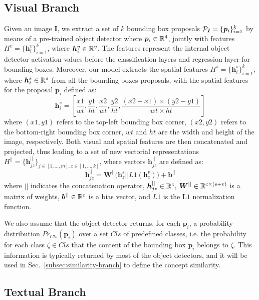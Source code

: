 \subsection{Visual Branch}
\label{subsec:visual-branch}

Given an image $\bm{I}$, we extract a set of $k$ bounding box
proposals $\mathcal{P}_{\bm{I}} = \{ \bm{p}_i \}^k_{i=1}$ by means of a
pre-trained object detector where $\bm{p}_i \in \mathbb{R}^4$, jointly with
features $H^v = \{ \bm{h}^v_i \}^k_{i=1}$, where $\bm{h}^v_i \in
\mathbb{R}^v$. The features represent the internal object detector
activation values before the classification layers and regression
layer for bounding boxes. Moreover, our model extracts the spatial
features $H^s = \{ \bm{h}^s_i \}^k_{i=1}$, where $\bm{h}^s_i \in
\mathbb{R}^s$ from all the bounding boxes proposals, with the spatial
features for the proposal $\bm{p}_i$ defined as:
\begin{equation}
  \bm{h}^s_i = \left[ \frac{x1}{wt}, \frac{y1}{ht}, \frac{x2}{wt}, \frac{y2}{ht}, \frac{(x2 - x1) \times (y2 - y1)}{wt \times ht}  \right]
\end{equation}
where $(x1, y1)$ refers to the top-left bounding box corner, $(x2,
y2)$ refers to the bottom-right bounding box corner, $wt$ and $ht$ are
the width and height of the image, respectively. Both visual and
spatial features are then concatenated and projected, thus leading to
a set of new vectorial representations $H^{||} = \{ \bm{h}^{||}_{jz}
\}_{j \in [1, \ldots, m], z \in [1, \ldots, k]}$, where vectors
$\bm{h}^{||}_{jz}$ are defined as:
\begin{equation}
  \bm{h}^{||}_{jz} = \bm{W}^{||} \big( \bm{h}^s_z || L1(\bm{h}^v_z) \big) + \bm{b}^{||}
  \label{eq:h-par-jz}
\end{equation}
where $||$ indicates the concatenation operator, $\bm{h}^{||}_{jz} \in
\mathbb{R}^c$, $\bm{W}^{||} \in \mathbb{R}^{c \times (s + v)}$ is a matrix of
weights, $\bm{b}^{||} \in \mathbb{R}^c$ is a bias vector, and $L1$ is the
L$1$ normalization function.

We also assume that the object detector returns, for each $\bm{p}_i$,
a probability distribution $Pr_{Cls}(\bm{p}_i)$ over a set $Cls$ of
predefined classes, i.e. the probability for each class $\zeta \in
Cls$ that the content of the bounding box $\bm{p}_i$ belongs to
$\zeta$. This information is typically returned by most of the object
detectors, and it will be used in Sec.~\ref{subsec:similarity-branch} to define the concept similarity.

\subsection{Textual Branch}
\label{subsec:textual-branch}

